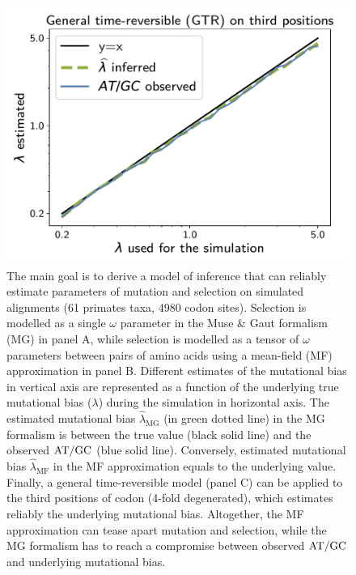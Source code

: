 \documentclass{article}
\begin{document}
\begin{figure}[!htb]
\begin{minipage}{0.325\linewidth}
 \end{minipage}
 \hfill
 \begin{minipage}{0.325\linewidth}
 	\includegraphics[width=\linewidth, page=1]{inference_simulations/lambda_GTR}
 \end{minipage}
 \hfill
 \caption[Estimation of mutational bias]{
 The main goal is to derive a model of inference that can reliably estimate parameters of mutation and selection on simulated alignments (61 primates taxa, 4980 codon sites).
 Selection is modelled as a single $\omega$ parameter in the Muse \& Gaut formalism ({MG}) in panel A, while selection is modelled as a tensor of $\omega$ parameters between pairs of amino acids using a mean-field ({MF}) approximation in panel B.
 Different estimates of the mutational bias in vertical axis are represented as a function of the underlying true mutational bias ($\lambda$) during the simulation in horizontal axis.
 The estimated mutational bias $\widehat{\lambda}_{\text{{MG}}}$ (in green dotted line) in the {MG} formalism is between the true value (black solid line) and the observed $\text{AT/GC}$ (blue solid line).
 Conversely, estimated mutational bias $\widehat{\lambda}_{\text{{MF}}}$ in the {MF} approximation equals to the underlying value.
 Finally, a general time-reversible model (panel C) can be applied to the third positions of codon (4-fold degenerated), which estimates reliably the underlying mutational bias.
 Altogether, the {MF} approximation can tease apart mutation and selection, while the {MG} formalism has to reach a compromise between observed $\text{AT/GC}$ and underlying mutational bias.
 }
 \label{fig:mut-bias-inference}
\end{figure}
\end{document}
